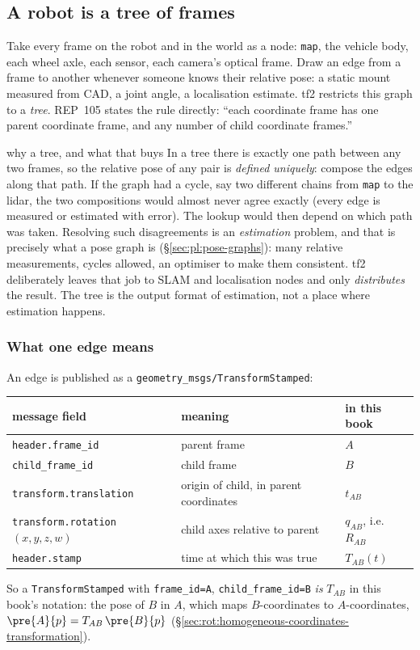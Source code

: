 \subsection{A robot is a tree of frames}\label{sec:rot:tf-tree}

Take every frame on the robot and in the world as a node: \texttt{map}, the vehicle body, each wheel axle, each sensor, each camera's optical frame. Draw an edge from a frame to another whenever someone knows their relative pose: a static mount measured from CAD, a joint angle, a localisation estimate. tf2 restricts this graph to a \emph{tree}. REP~105 states the rule directly: ``each coordinate frame has one parent coordinate frame, and any number of child coordinate frames.''

\begin{deriv}{why a tree, and what that buys}
In a tree there is exactly one path between any two frames, so the relative pose of any pair is \emph{defined uniquely}: compose the edges along that path. If the graph had a cycle, say two different chains from \texttt{map} to the lidar, the two compositions would almost never agree exactly (every edge is measured or estimated with error). The lookup would then depend on which path was taken. Resolving such disagreements is an \emph{estimation} problem, and that is precisely what a pose graph is (\S\ref{sec:pl:pose-graphs}): many relative measurements, cycles allowed, an optimiser to make them consistent. tf2 deliberately leaves that job to SLAM and localisation nodes and only \emph{distributes} the result. The tree is the output format of estimation, not a place where estimation happens.
\end{deriv}

\subsubsection{What one edge means}
An edge is published as a \texttt{geometry\_msgs/TransformStamped}:
\begin{center}\small
\begin{tabular}{@{}lll@{}}\toprule
message field & meaning & in this book\\\midrule
\texttt{header.frame\_id} & parent frame & $A$\\
\texttt{child\_frame\_id} & child frame & $B$\\
\texttt{transform.translation} & origin of child, in parent coordinates & $t_{AB}$\\
\texttt{transform.rotation} $(x,y,z,w)$ & child axes relative to parent & $q_{AB}$, i.e.\ $R_{AB}$\\
\texttt{header.stamp} & time at which this was true & $T_{AB}(t)$\\\bottomrule
\end{tabular}
\end{center}
So a \texttt{TransformStamped} with \texttt{frame\_id=A}, \texttt{child\_frame\_id=B} \emph{is} $T_{AB}$ in this book's notation: the pose of $B$ in $A$, which maps $B$-coordinates to $A$-coordinates, $\pre{A}{p}=T_{AB}\,\pre{B}{p}$ (\S\ref{sec:rot:homogeneous-coordinates-transformation}).

